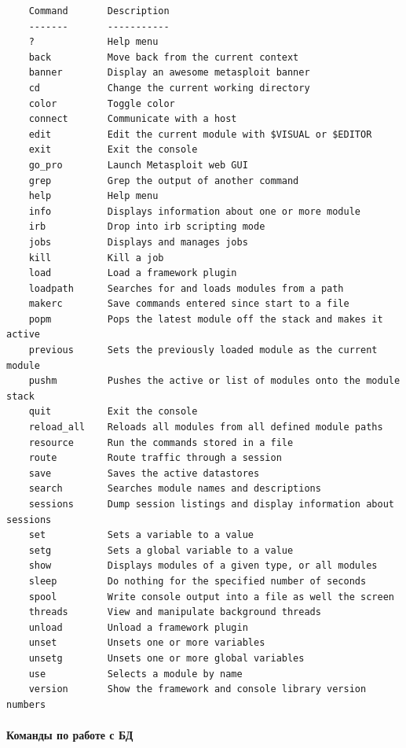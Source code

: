 \documentclass{article}
\begin{document}
\begin{verbatim}
    Command       Description
    -------       -----------
    ?             Help menu
    back          Move back from the current context
    banner        Display an awesome metasploit banner
    cd            Change the current working directory
    color         Toggle color
    connect       Communicate with a host
    edit          Edit the current module with $VISUAL or $EDITOR
    exit          Exit the console
    go_pro        Launch Metasploit web GUI
    grep          Grep the output of another command
    help          Help menu
    info          Displays information about one or more module
    irb           Drop into irb scripting mode
    jobs          Displays and manages jobs
    kill          Kill a job
    load          Load a framework plugin
    loadpath      Searches for and loads modules from a path
    makerc        Save commands entered since start to a file
    popm          Pops the latest module off the stack and makes it active
    previous      Sets the previously loaded module as the current module
    pushm         Pushes the active or list of modules onto the module stack
    quit          Exit the console
    reload_all    Reloads all modules from all defined module paths
    resource      Run the commands stored in a file
    route         Route traffic through a session
    save          Saves the active datastores
    search        Searches module names and descriptions
    sessions      Dump session listings and display information about sessions
    set           Sets a variable to a value
    setg          Sets a global variable to a value
    show          Displays modules of a given type, or all modules
    sleep         Do nothing for the specified number of seconds
    spool         Write console output into a file as well the screen
    threads       View and manipulate background threads
    unload        Unload a framework plugin
    unset         Unsets one or more variables
    unsetg        Unsets one or more global variables
    use           Selects a module by name
    version       Show the framework and console library version numbers
\end{verbatim}

\paragraph{Команды по работе с БД}
~
\end{document}
